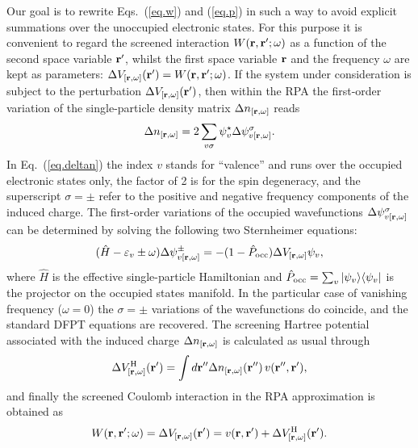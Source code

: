 \documentclass[twocolumn,prb,showpacs,superscriptaddress]{revtex4}
\def\s1{\hspace{0.5cm}}
\def\s2{\hspace{1cm}}
\def\w{\omega}
\def\H{\hat{H}}
\def\P{\hat{P}_{\rm occ}}
\def\E{\varepsilon}
\def\s{\sigma}
\def\r{{\bf r}}
\def\rp{{\bf r^\prime}}
\def\rpp{{\bf r^{\prime\prime}}}
\begin{document}
Our goal is to rewrite Eqs.\ (\ref{eq.w}) and (\ref{eq.p})
in such a way to avoid explicit summations over the unoccupied electronic states.
For this purpose it is convenient to regard the screened interaction
$W(\r,\rp;\w)$ as a function of the 
second space variable $\rp$, whilst the first space variable 
$\r$ and the frequency $\w$ are kept as parameters: $\Delta V_{[\r,\w]}(\rp) = W(\r,\rp;\w)$.
If the system under consideration is subject to the perturbation
$\Delta V_{[\r,\w]}(\rp)$, then within the RPA the first-order variation 
of the single-particle density matrix $\Delta n_{[\r,\w]}$ reads
  \begin{equation}\label{eq.deltan}
  \Delta n_{[\r,\w]} = 2\sum_{v\s} \psi_v^\star  \Delta \psi^\s_{v[\r,\w]}.
  \end{equation}
In Eq.\ (\ref{eq.deltan}) the index $v$ stands for ``valence'' and runs
over the occupied electronic states only, the factor of 2 is for the spin degeneracy, 
and the superscript $\sigma=\pm$ refer to the positive and negative
frequency components of the induced charge.
The first-order variations of the occupied wavefunctions $\Delta \psi^\s_{v[\r,\w]}$
can be determined by solving the following two Sternheimer equations:
  \begin{equation}\label{eq.linsys.1}
  (\H-\E_v\pm\w) \Delta \psi^\pm_{v[\r,\w]}  = -(1-\P)  \Delta V_{[\r,\w]} \psi_v, 
  \end{equation}
where $\H$ is the effective single-particle Hamiltonian and 
$\P=\sum_v |\psi_v\rangle\langle\psi_v|$ is the projector
on the occupied states manifold. 
In the particular case of vanishing frequency ($\w=0$)
the $\sigma=\pm$ variations of the wavefunctions do coincide,
and the standard DFPT equations are recovered.
The screening Hartree potential associated with the induced charge 
$\Delta n_{[\r,\w]}$ is calculated as usual through
  \begin{equation}\label{eq.dhartree}
  \Delta V^{\rm H}_{[\r,\w]}(\rp) = \int d\rpp \Delta n_{[\r,\w]} (\rpp) \, v(\rpp,\rp),
  \end{equation}
and finally the screened Coulomb interaction in the RPA approximation is obtained as 
  \begin{equation}\label{eq.w.dfpt}
  W(\r,\rp;\w) = \Delta V_{[\r,\w]}(\rp) = v(\r,\rp) + \Delta V^{\rm H}_{[\r,\w]}(\rp).
  \end{equation}
\end{document}
